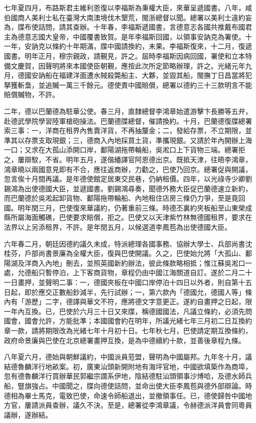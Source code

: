 \begin{pinyinscope}
七年夏四月，布路斯君主維利恩復以李福斯為秉權大臣，來華呈遞國書。八年，咸伯國商人美利士私在臺灣大南澳境伐木墾荒，閩浙總督以聞。總署以美利士違約妄為，牒布使詰問，請其查辦。十年春，李福斯遞國書，言德意志各國共推戴布國君主為德意志國大皇帝，中國覆書致賀。是年李福斯回國，以領事安訥克為署使。十一年，安訥克以條約十年期滿，牒中國請換約，未果。李福斯復來，十二月，復遞國書。明年正月，穆宗親政，請覲見，許之。屆時李福斯因病回國，署使和立本特備文慶賀，因聲明將來本國使臣朝覲，應按此次所定節略辦理，許之。光緒元年九月，德國安訥船在福建洋面遭水賊殺斃船主、大夥，並毀其船，閩撫丁日昌當將犯拏獲斬梟，並追贓一萬三千餘元。德使責中國賠償，總署以德約三十三款明言不能賠償贓物，不許。

二年，德以巴蘭德為駐華公使。春三月，直隸總督李鴻章始遣游擊卞長勝等五弁，赴德武學院學習陸軍槍砲操法。巴蘭德牒總督，催請換約。十月，巴蘭德復牒總署索三事：一，洋商在租界內售賣洋貨，不再抽釐金；二，發給存票，不立期限，並準其以存票支取現銀；三，德商入內地採買土貨，準攜現銀。又請於年內開辦上海一口；又求在大孤山添開口岸，鄱陽湖拖帶輪船，吳淞口上下貨物三端。總署拒之，屢辯駮，不省。明年五月，遂偕繙譯官阿恩德出京。既抵天津，往晤李鴻章，鴻章曉以兩國意見即有不合，應往返商辦，力勸之，巴使乃回京。總署促與開議，忽言俟十月間再議。是年德使館定居東交民巷，仍納租價。四年，以光祿寺少卿劉錫鴻為出使德國大臣，並遞國書。劉錫鴻尋奏，聞德外務大臣促巴蘭德速立新約，而巴蘭德於吳淞起卸貨物、鄱陽拖帶輪船、內地租住店房三條仍力爭，至是竟回國。明年閏三月，巴使復來華議約，仍著重前三條。時德丕裏約夾板船至山東榮成縣所屬海面觸礁，巴使要求賠償，拒之。巴使又以天津紫竹林無德國租界，要求在法界以上另添租界，不許。是年閏五月，以候選道李鳳苞為出使德國大臣。

六年春二月，朝廷因德約議久未成，特派總理各國事務、協辦大學士、兵部尚書沈桂芬，戶部尚書景廉為全權大臣，復與巴使開議。久之，巴使始允將「大孤山、鄱陽湖及洋商入內地」刪去，並照英國新約辦法，彼此條款略相抵；惟江蘇吳淞口一處，允德船只暫停泊，上下客商貨物，章程仍由中國江海關道自訂。遂於二月二十一日畫押，並聲明二事：一，德國夾板在中國口岸停泊十四日以外者，則自第十五日起，即於應交正數船鈔減半，先行試辦；一，第六款內「德國允，德國人等」條內有「游歷」二字，德譯與華文不符，應將德文字意更正。遂約自畫押之日起，限一年內互換。已，巴使於六月三十日又來牒，稱德國國法，凡議立條約，必須先問國會，國會允許，方能批準；本國國會約在明年，所議光緒七年三月初二日互換約章一款，請將期限改為光緒七年十月初十日。七年秋七月，巴使請定期互換條約，政府命景廉與巴使在北京總署畫押互換，是為中德續約十款，並善後章程九條。

八年夏六月，德始與朝鮮議約，中國派員蒞盟，聲明為中國屬邦。九年冬十月，議結德魯麟洋行地畝案。初，廣東汕頭新開附地有海坪官地，中國欲填築作為商埠，忽有德魯麟洋行買辦華民郭繼宗謂系伊地，陰結德駐汕頭領事沙博哈，及德水師兵船，豎旗強占。中國聞之，牒向德使詰問，並命出使大臣李鳳苞與德外部辯論。時德相為畢士馬克，電致巴使，命速令師船退出，並撤領事任。已，德使歸咎中國地方官，屢請派員查辦，議久不決。至是，總署從李鴻章議，令赫德派洋員會同粵員議辦，遂辦結。


\end{pinyinscope}
